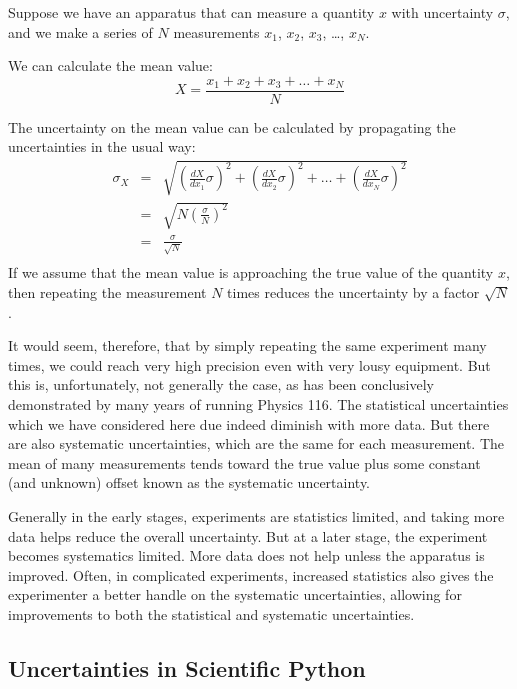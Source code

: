 \documentclass[12pt]{article}
\begin{document}
Suppose we have an apparatus that can measure a quantity $x$ with uncertainty $\sigma$, and we make a series of $N$ measurements $x_1$, $x_2$, $x_3$, \ldots, $x_N$.

We can calculate the mean value:
\begin{displaymath}
X = \frac{x_1 + x_2 + x_3 + \ldots + x_N}{N}
\end{displaymath}

The uncertainty on the mean value can be calculated by propagating the uncertainties in the usual way:
\begin{eqnarray*}
\sigma_X &=& \sqrt{\left(\frac{dX}{dx_1} \sigma \right)^2 
+ \left(\frac{dX}{dx_2} \sigma \right)^2 +  \ldots + \left(\frac{dX}{dx_N} \sigma \right)^2 } \\
&=& \sqrt{N \left(\frac{\sigma}{N} \right)^2}\\ 
&=& \frac{\sigma}{\sqrt{N}} \\
\end{eqnarray*}
If we assume that the mean value is approaching the true value of the quantity $x$, then repeating the measurement $N$ times reduces the uncertainty by a factor $\sqrt{N}$.

It would seem, therefore, that by simply repeating the same experiment many times, we could reach very high precision even with very lousy equipment.  But this is, unfortunately, not generally the case, as has been conclusively demonstrated by many years of running Physics 116.  The statistical uncertainties which we have considered here due indeed diminish with more data.  But there are also systematic uncertainties, which are the same for each measurement.  The mean of many measurements tends toward the true value plus some constant (and unknown) offset known as the systematic uncertainty.  

Generally in the early stages, experiments are statistics limited, and taking more data helps reduce the overall uncertainty.  But at a later stage, the experiment becomes systematics limited.  More data does not help unless the apparatus is improved.  Often, in complicated experiments, increased statistics also gives the experimenter a better handle on the systematic uncertainties, allowing for improvements to both the statistical and systematic uncertainties.

\subsection{Uncertainties in Scientific Python}
\end{document}
